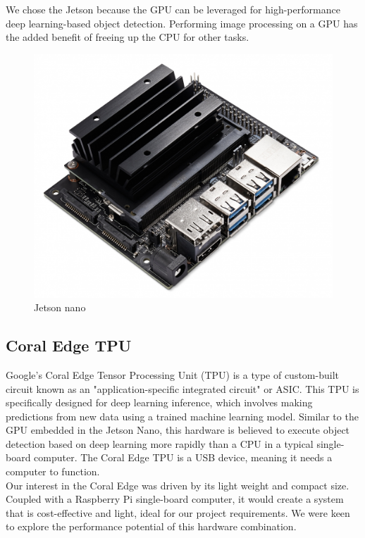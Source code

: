 We chose the Jetson because the GPU can be leveraged for high-performance deep learning-based object detection. Performing image processing on a GPU has the added benefit of freeing up the CPU for other tasks.\cite{gpudeeplearningperf}\\

\begin{figure}[h]
    \centering
    \includegraphics[scale=0.2]{fig/JetsonNano-DevKit_Front-Top_Right_trimmed.jpg}
    \caption{Jetson nano \cite{Jetson}}
\end{figure}

\subsection{Coral Edge TPU}
Google's Coral Edge Tensor Processing Unit (TPU) is a type of custom-built circuit known as an "application-specific integrated circuit" or ASIC. This TPU is specifically designed for deep learning inference, which involves making predictions from new data using a trained machine learning model. Similar to the GPU embedded in the Jetson Nano, this hardware is believed to execute object detection based on deep learning more rapidly than a CPU in a typical single-board computer. The Coral Edge TPU is a USB device, meaning it needs a computer to function.\\

Our interest in the Coral Edge was driven by its light weight and compact size. Coupled with a Raspberry Pi single-board computer, it would create a system that is cost-effective and light, ideal for our project requirements. We were keen to explore the performance potential of this hardware combination.\\

